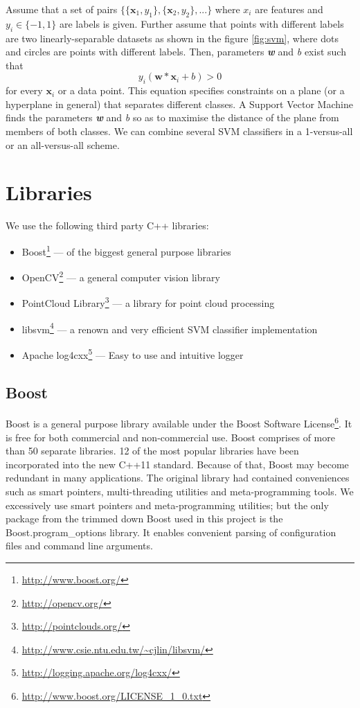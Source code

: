 	Assume that a set of pairs $\{\{\mathbf{x}_1, y_1\}, \{\mathbf{x}_2, y_2\}, ...\}$ where $x_\mathit{i}$ are features and $y_\mathit{i} \in \{-1, 1\}$ are labels is given. Further assume that points with different labels are two linearly-separable datasets as shown in the figure \ref{fig:svm}, where dots and circles are points with different labels. Then, parameters \textbf{\textit{w}} and  \textit{b} exist such that	
	\begin{equation}	                        y_\mathit{i}\left(\mathbf{w}*\mathbf{x}_\mathit{i} + b\right) > 0
	\end{equation}
	for every $\mathbf{x}_\mathit{i}$ or a data point. This equation specifies constraints on a plane (or a hyperplane in general) that separates different classes. A Support Vector Machine finds the parameters \textbf{\textit{w}} and  \textit{b} so as to maximise the distance of the plane from members of both classes. We can combine several SVM classifiers in a 1-versus-all or an all-versus-all scheme.
	
\section{Libraries}

	We use the following third party C++ libraries:
	\begin{itemize}
	 \item Boost\footnote{\url{http://www.boost.org/}} --- of the biggest general purpose libraries
	 \item OpenCV\footnote{\url{http://opencv.org/}} --- a general computer vision library
	 \item PointCloud Library\footnote{\url{http://pointclouds.org/}} \cite{PCL} --- a library for point cloud processing
	 \item libsvm\footnote{\url{http://www.csie.ntu.edu.tw/~cjlin/libsvm/}} \cite{libsvm} --- a renown and very efficient SVM classifier implementation
	 \item Apache log4cxx\footnote{\url{http://logging.apache.org/log4cxx/}} --- Easy to use and intuitive logger
	\end{itemize}
	
	\subsection{Boost}
	Boost is a general purpose library available under the Boost Software License\footnote{\url{http://www.boost.org/LICENSE_1_0.txt}}. It is free for both commercial and non-commercial use. Boost comprises of more than 50 separate libraries. 12 of the most popular libraries have been incorporated into the new C++11 standard. Because of that, Boost may become redundant in many applications. The original library had contained conveniences such as smart pointers, multi-threading utilities and meta-programming tools. We excessively use smart pointers and meta-programming utilities; but the only package from the trimmed down Boost used in this project is the Boost.program\_options library. It enables convenient parsing of configuration files and command line arguments.
	
